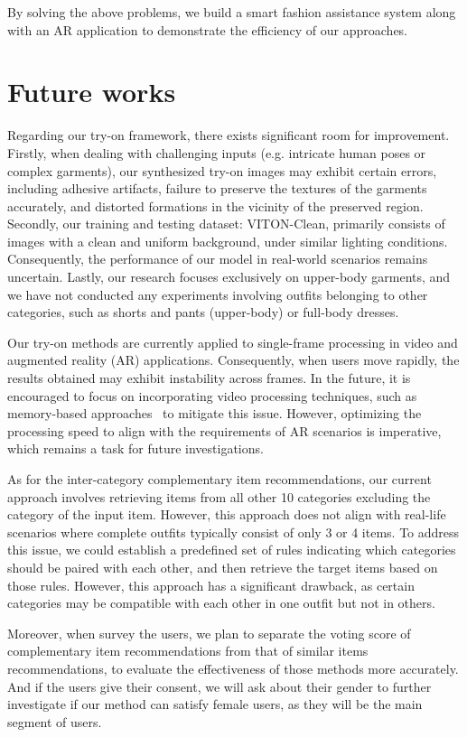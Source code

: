 By solving the above problems, we build a smart fashion assistance system along with an AR application to demonstrate the efficiency of our approaches.

\section{Future works}

Regarding our try-on framework, there exists significant room for improvement. Firstly, when dealing with challenging inputs (e.g. intricate human poses or complex garments), our synthesized try-on images may exhibit certain errors, including adhesive artifacts, failure to preserve the textures of the garments accurately, and distorted formations in the vicinity of the preserved region. Secondly, our training and testing dataset: VITON-Clean, primarily consists of images with a clean and uniform background, under similar lighting conditions. Consequently, the performance of our model in real-world scenarios remains uncertain. Lastly, our research focuses exclusively on upper-body garments, and we have not conducted any experiments involving outfits belonging to other categories, such as shorts and pants (upper-body) or full-body dresses.

Our try-on methods are currently applied to single-frame processing in video and augmented reality (AR) applications. Consequently, when users move rapidly, the results obtained may exhibit instability across frames.  In the future, it is encouraged to focus on incorporating video processing techniques, such as memory-based approaches~\cite{Zhong-ACMMM2021-Mvton} to mitigate this issue. However, optimizing the processing speed to align with the requirements of AR scenarios is imperative, which remains a task for future investigations.

As for the inter-category complementary item recommendations, our current approach involves retrieving items from all other 10 categories excluding the category of the input item. However, this approach does not align with real-life scenarios where complete outfits typically consist of only 3 or 4 items. To address this issue, we could establish a predefined set of rules indicating which categories should be paired with each other, and then retrieve the target items based on those rules. However, this approach has a significant drawback, as certain categories may be compatible with each other in one outfit but not in others. 

Moreover, when survey the users, we plan to separate the voting score of complementary item recommendations from that of similar items recommendations, to evaluate the effectiveness of those methods more accurately. And if the users give their consent, we will ask about their gender to further investigate if our method can satisfy female users, as they will be the main segment of users.

